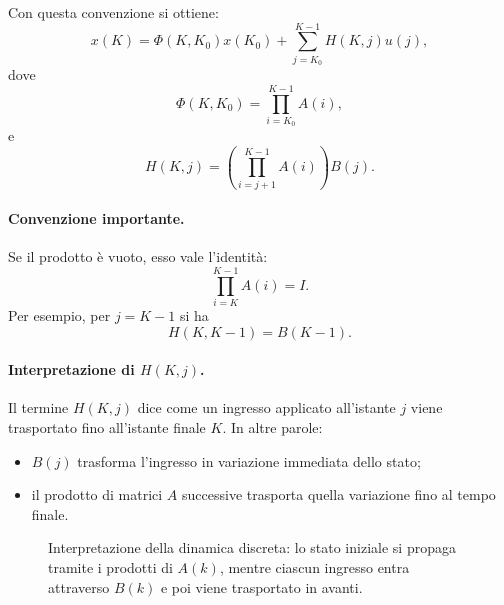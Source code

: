 Con questa convenzione si ottiene:
\begin{equation}
x(K)=\Phi(K,K_0)x(K_0)+\sum_{j=K_0}^{K-1}H(K,j)u(j),
\label{eq:L4_explicit_TD}
\end{equation}
dove
\begin{equation}
\Phi(K,K_0)=\prod_{i=K_0}^{K-1}A(i),
\label{eq:L4_Phi_TD_generic}
\end{equation}
e
\begin{equation}
H(K,j)=\left(\prod_{i=j+1}^{K-1}A(i)\right)B(j).
\label{eq:L4_H_TD_generic}
\end{equation}

\paragraph{Convenzione importante.}
Se il prodotto è vuoto, esso vale l'identità:
\[
\prod_{i=K}^{K-1}A(i)=I.
\]
Per esempio, per $j=K-1$ si ha
\[
H(K,K-1)=B(K-1).
\]

\paragraph{Interpretazione di $H(K,j)$.}
Il termine $H(K,j)$ dice come un ingresso applicato all'istante $j$ viene trasportato fino all'istante finale $K$.  
In altre parole:
\begin{itemize}
    \item $B(j)$ trasforma l'ingresso in variazione immediata dello stato;
    \item il prodotto di matrici $A$ successive trasporta quella variazione fino al tempo finale.
\end{itemize}

\begin{figure}[H]
\centering
{}
\caption{Interpretazione della dinamica discreta: lo stato iniziale si propaga tramite i prodotti di $A(k)$, mentre ciascun ingresso entra attraverso $B(k)$ e poi viene trasportato in avanti.}
\end{figure}

